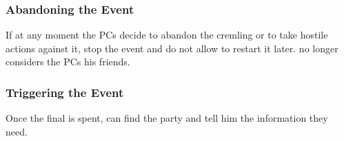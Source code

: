 \subsubsection{Abandoning the Event}

If at any moment the PCs decide to abandon the cremling or to take hostile actions against it, stop the event and do not allow to restart it later. \npcArclo{} no longer considers the PCs his friends.

\subsubsection{Triggering the Event}

Once the final \iconOpp{} is spent, \npcArclo{} can find the party and tell him the information they need.

